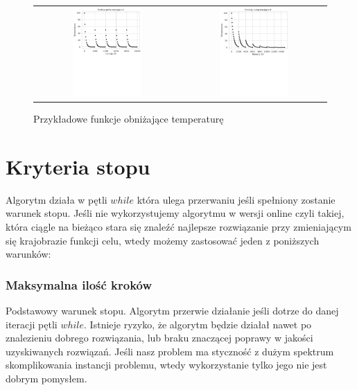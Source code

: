 \begin{figure}[!h]
\begin{tabular}{ c c }
	\includegraphics[width=0.5\textwidth]{gfx/temp_heater_a.pdf} & \includegraphics[width=0.5\textwidth]{gfx/temp_heater_b.pdf}
\end{tabular}
	\caption{Przykładowe funkcje obniżające temperaturę}
	\label{example-cooling-functions}
\end{figure}
\pagebreak
\section{Kryteria stopu}
Algorytm działa w pętli $while$ która ulega przerwaniu jeśli spełniony zostanie
warunek stopu. Jeśli nie wykorzystujemy algorytmu w wersji online czyli takiej,
która ciągle na bieżąco stara się znaleźć najlepsze rozwiązanie przy
zmieniającym się krajobrazie funkcji celu, wtedy możemy zastosować jeden z
poniższych warunków:

\subsubsection{Maksymalna ilość kroków} 
Podstawowy warunek stopu. Algorytm przerwie działanie jeśli dotrze do danej
iteracji pętli $while$. Istnieje ryzyko, że algorytm będzie działał nawet po
znalezieniu dobrego rozwiązania, lub braku znaczącej poprawy w jakości
uzyskiwanych rozwiązań. Jeśli nasz problem ma styczność z dużym spektrum
skomplikowania instancji problemu, wtedy wykorzystanie tylko jego nie jest
dobrym pomysłem.

